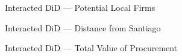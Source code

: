 \documentclass[9pt,aspectratio=169]{beamer}
\begin{document}
\begin{frame}{Interacted DiD --- Potential Local Firms}
\small\medskip
\resizebox{\textwidth}{!}{%
}
\end{frame}

\begin{frame}{Interacted DiD --- Distance from Santiago}
\small\medskip
\resizebox{\textwidth}{!}{%
}
\end{frame}

\begin{frame}{Interacted DiD --- Total Value of Procurement}
\small\medskip
\resizebox{\textwidth}{!}{%
}
\end{frame}


      
\end{document}
